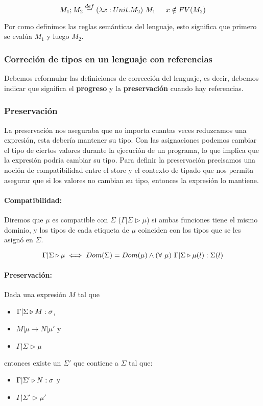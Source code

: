 $$M_1;M_2 \overset{def}{=} (\lambda x: Unit . M_2)~M_1 \hspace*{5mm} x\notin FV(M_2)$$

Por como definimos las reglas semánticas del lenguaje, esto significa que primero se evalúa $M_1$ y luego $M_2$. 


\subsubsection{Correción de tipos en un lenguaje con referencias}
Debemos reformular las definiciones de corrección del lenguaje, es decir, debemos indicar que significa el \textbf{progreso} y la \textbf{preservación} cuando hay referencias.

\subsubsection{Preservación} La preservación nos aseguraba que no importa cuantas veces reduzcamos una expresión, esta debería mantener su tipo. Con las asignaciones podemos cambiar el tipo de ciertos valores durante la ejecución de un programa, lo que implica que la expresión podria cambiar su tipo. Para definir la preservación precisamos una noción de compatibilidad entre el store y el contexto de tipado que nos permita asegurar que si los valores no cambian su tipo, entonces la expresión lo mantiene.

\paragraph{Compatibilidad:}
Diremos que $\mu$ es compatible con $\Sigma$ ($\Gamma|\Sigma\triangleright\mu$) si ambas funciones tiene el mismo dominio, y los tipos de cada etiqueta de $\mu$ coinciden con los tipos que se les asignó en $\Sigma$.

$$ \Gamma|\Sigma\triangleright\mu  \iff Dom(\Sigma) = Dom(\mu) \land (\forall~\mu)~\Gamma|\Sigma\triangleright \mu(l) : \Sigma(l)$$

\paragraph{Preservación:} Dada una expresión $M$ tal que
\begin{itemize}
	\item $\Gamma|\Sigma\triangleright M : \sigma$, 
	\item $M|\mu\to N|\mu'$ y
	\item $\Gamma|\Sigma\triangleright\mu$
\end{itemize}
entonces existe un 	$\Sigma'$ que contiene a $\Sigma$ tal que:
\begin{itemize}
	\item $\Gamma|\Sigma'\triangleright N : \sigma$ y
	\item $\Gamma|\Sigma'\triangleright\mu'$
\end{itemize}

